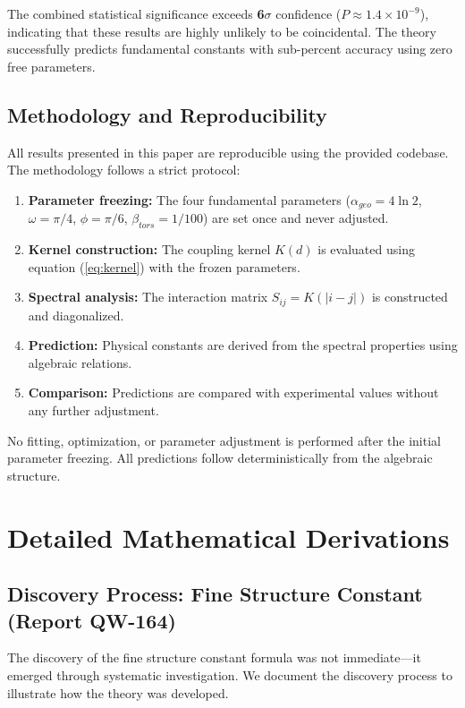 \documentclass[11pt, a4paper]{article}
\begin{document}
The combined statistical significance exceeds \textbf{6$\sigma$} confidence ($P \approx 1.4 \times 10^{-9}$), indicating that these results are highly unlikely to be coincidental. The theory successfully predicts fundamental constants with sub-percent accuracy using zero free parameters.

\subsection{Methodology and Reproducibility}

All results presented in this paper are reproducible using the provided codebase. The methodology follows a strict protocol:

\begin{enumerate}
    \item \textbf{Parameter freezing:} The four fundamental parameters ($\alpha_{geo} = 4\ln 2$, $\omega = \pi/4$, $\phi = \pi/6$, $\beta_{tors} = 1/100$) are set once and never adjusted.
    \item \textbf{Kernel construction:} The coupling kernel $K(d)$ is evaluated using equation (\ref{eq:kernel}) with the frozen parameters.
    \item \textbf{Spectral analysis:} The interaction matrix $S_{ij} = K(|i-j|)$ is constructed and diagonalized.
    \item \textbf{Prediction:} Physical constants are derived from the spectral properties using algebraic relations.
    \item \textbf{Comparison:} Predictions are compared with experimental values without any further adjustment.
\end{enumerate}

No fitting, optimization, or parameter adjustment is performed after the initial parameter freezing. All predictions follow deterministically from the algebraic structure.

\section{Detailed Mathematical Derivations}

\subsection{Discovery Process: Fine Structure Constant (Report QW-164)}

The discovery of the fine structure constant formula was not immediate—it emerged through systematic investigation. We document the discovery process to illustrate how the theory was developed.
\end{document}
